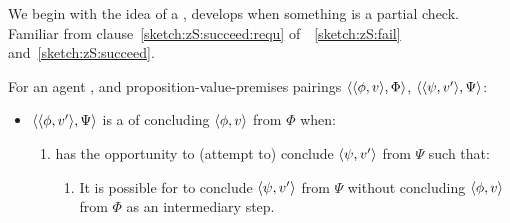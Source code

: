 \begin{note}[\requ{3}]
  We begin with the idea of a \requ{}, develops when something is a partial check.
  Familiar from clause~\autoref{sketch:zS:succeed:requ} of~~\ref{sketch:zS:fail} and~\ref{sketch:zS:succeed}.

  \begin{definition}[A \requ{0}]
    \label{idea:requ}
    For an agent \vAgent{}, and proposition-value-premises pairings \(\langle \langle \phi, v \rangle, \Phi \rangle\), \(\langle \langle \psi, v' \rangle, \Psi \rangle\):

    \begin{itemize}
    \item
      \(\langle \langle \phi, v' \rangle, \Psi \rangle\) is a \emph{\requ{}} of concluding \(\langle \phi, v \rangle\) from \(\Phi\) when:
      \begin{enumerate}[label=\arabic*., ref=\named{R:\arabic*}]
      \item
        \label{idea:requ:pool}
        \vAgent{} has the opportunity to (attempt to) conclude \(\langle \psi, v' \rangle\) from \(\Psi\) such that:
        \begin{enumerate}[label=\roman*., ref=\named{R:1\roman*}]
        \item
          \label{idea:requ:pool:int}
          It is possible for \vAgent{} to conclude \(\langle \psi, v' \rangle\) from \(\Psi\) without concluding \(\langle \phi, v \rangle\) from \(\Phi\) as an intermediary step.
        \end{enumerate}
      \end{enumerate}


\end{itemize}
\end{definition}
\end{note}
